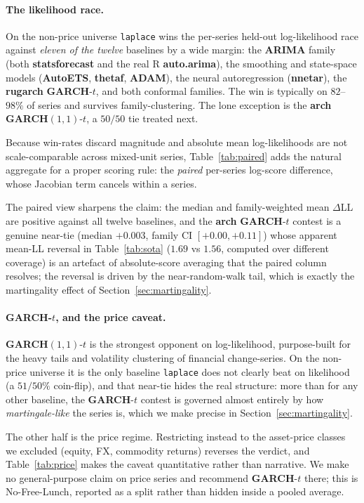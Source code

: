 \documentclass[article]{jss}
\providecommand{\proglang}[1]{\textsf{#1}}
\providecommand{\pkg}[1]{\textbf{#1}}
\providecommand{\code}[1]{\texttt{#1}}
\begin{document}
\paragraph{The likelihood race.}
On the non-price universe \code{laplace} wins the per-series held-out
log-likelihood race against \emph{eleven of the twelve} baselines by a wide
margin: the \pkg{ARIMA} family (both \pkg{statsforecast} and the real
\proglang{R} \pkg{auto.arima}), the smoothing and state-space models
(\pkg{AutoETS}, \pkg{thetaf}, \pkg{ADAM}), the neural autoregression
(\pkg{nnetar}), the \pkg{rugarch} \pkg{GARCH}-$t$, and both conformal families.
The win is typically on $82$--$98\%$ of series and survives family-clustering. The
lone exception is the \pkg{arch} \pkg{GARCH}$(1,1)$-$t$, a $50/50$ tie treated
next.

Because win-rates discard magnitude and absolute mean log-likelihoods are
not scale-comparable across mixed-unit series, Table~\ref{tab:paired} adds the
natural aggregate for a proper scoring rule: the \emph{paired} per-series
log-score difference, whose Jacobian term cancels within a series.

The paired
view sharpens the claim: the median and family-weighted mean $\Delta$LL are
positive against all twelve baselines, and the \pkg{arch} \pkg{GARCH}-$t$
contest is a genuine near-tie (median $+0.003$, family CI $[+0.00, +0.11]$)
whose apparent mean-LL reversal in Table~\ref{tab:sota} ($1.69$ vs $1.56$,
computed over different coverage) is an artefact of absolute-score averaging
that the paired column resolves; the reversal is driven by the near-random-walk
tail, which is exactly the martingality effect of Section~\ref{sec:martingality}.

\paragraph{\pkg{GARCH}-$t$, and the price caveat.}
\pkg{GARCH}$(1,1)$-$t$ is the strongest opponent on log-likelihood, purpose-built
for the heavy tails and volatility clustering of financial change-series. On the
non-price universe it is the only baseline \code{laplace} does not clearly beat on
likelihood (a $51/50\%$ coin-flip), and that near-tie hides the real
structure: more than for any other baseline, the \pkg{GARCH}-$t$ contest is governed
almost entirely by how
\emph{martingale-like} the series is, which we make precise in
Section~\ref{sec:martingality}.

The other half is the price regime.
Restricting instead to the asset-price classes we
excluded (equity, FX, commodity returns) reverses the verdict, and
Table~\ref{tab:price} makes the caveat quantitative rather than narrative. We
make no general-purpose claim on price series and recommend \pkg{GARCH}-$t$
there; this is No-Free-Lunch, reported as a split rather than hidden inside a
pooled average.
\end{document}
